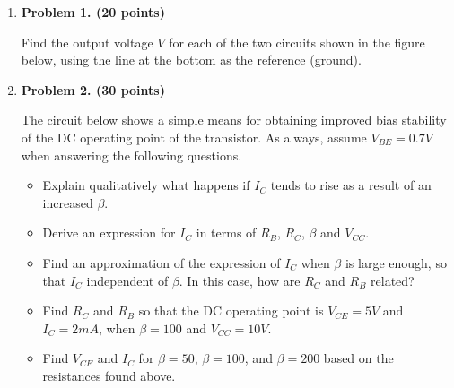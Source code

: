 \begin{enumerate}

\item {\bf Problem 1. (20 points)} 

Find the output voltage $V$ for each of the two circuits shown in the 
figure below, using the line at the bottom as the reference (ground).



\item {\bf Problem 2. (30 points)} 

The circuit below shows a simple means for obtaining improved bias
stability of the DC operating point of the transistor. As always,
assume $V_{BE}=0.7V$ when answering the following questions.


\begin{itemize}
\item Explain qualitatively what happens if $I_C$ tends to rise as a
  result of an increased $\beta$.
\item Derive an expression for $I_C$ in terms of $R_B$, $R_C$, $\beta$
  and $V_{CC}$.
\item Find an approximation of the expression of $I_C$ when $\beta$ is 
  large enough, so that $I_C$ independent of $\beta$. In this case, how 
  are $R_C$ and $R_B$ related?
\item Find $R_C$ and $R_B$ so that the DC operating point is $V_{CE}=5V$ 
and $I_C=2mA$, when $\beta=100$ and $V_{CC}=10V$. 
\item Find $V_{CE}$ and $I_C$ for $\beta=50$, $\beta=100$, and $\beta=200$
	based on the resistances found above.
\end{itemize}

\begin{comment}
{\bf Solution:} 


\end{comment}
\end{enumerate}
